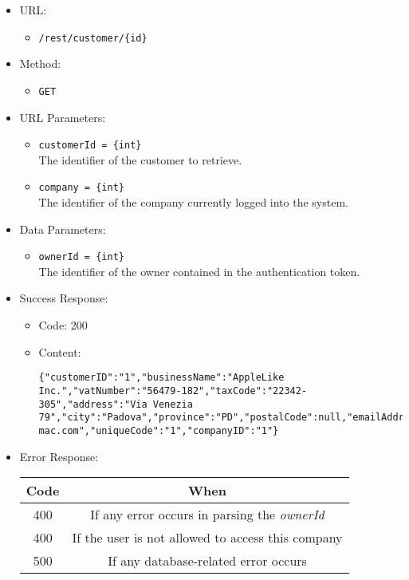 \begin{itemize}

    \item URL:
    \begin{itemize}
        \item \texttt{/rest/customer/\{id\}}
    \end{itemize}

    \item Method:
    \begin{itemize}
        \item \texttt{GET}
    \end{itemize}

    \item URL Parameters:
    \begin{itemize}
        \item \texttt{customerId = \{int\}} \\
        The identifier of the customer to retrieve.
        \item \texttt{company = \{int\}} \\
        The identifier of the company currently logged into the system.
    \end{itemize}

    \item Data Parameters:
    \begin{itemize}
        \item \texttt{ownerId = \{int\}} \\
        The identifier of the owner contained in the authentication token.
    \end{itemize}

    \item Success Response:
    \begin{itemize}
        \item Code: 200
        \item Content:
        \begin{lstlisting}
{"customerID":"1","businessName":"AppleLike Inc.","vatNumber":"56479-182","taxCode":"22342-305","address":"Via Venezia 79","city":"Padova","province":"PD","postalCode":null,"emailAddress":"applelike@google.com","pec":"applelike@pec-mac.com","uniqueCode":"1","companyID":"1"}
        \end{lstlisting}
    \end{itemize}

    \item Error Response:
    \begin{table}[!h]
    \centering
    \begin{tabular}{|c|c|}
    \hline
    \multicolumn{1}{|c|}{\textbf{Code}} & \multicolumn{1}{c|}{\textbf{When}} \\ \hline
    400 & If any error occurs in parsing the \textit{ownerId}  \\\hline
    400 & If the user is not allowed to access this company \\\hline
    500 & If any database-related error occurs \\\hline
    \end{tabular}
    \end{table}

\end{itemize}


